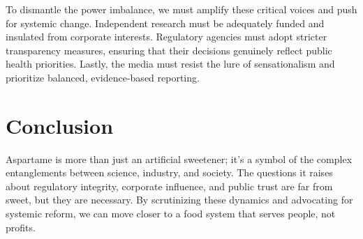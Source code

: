 To dismantle the power imbalance, we must amplify these critical voices and push for systemic change. Independent research must be adequately funded and insulated from corporate interests. Regulatory agencies must adopt stricter transparency measures, ensuring that their decisions genuinely reflect public health priorities. Lastly, the media must resist the lure of sensationalism and prioritize balanced, evidence-based reporting.

\section*{Conclusion}

Aspartame is more than just an artificial sweetener; it’s a symbol of the complex entanglements between science, industry, and society. The questions it raises about regulatory integrity, corporate influence, and public trust are far from sweet, but they are necessary. By scrutinizing these dynamics and advocating for systemic reform, we can move closer to a food system that serves people, not profits.


